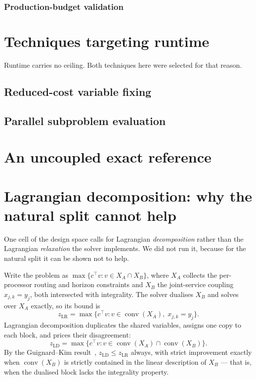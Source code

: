 \documentclass[11pt,a4paper]{article}
\begin{document}


\subsubsection{Production-budget validation}\label{sec:prod}



\section{Techniques targeting runtime}\label{sec:runtime}

Runtime carries no ceiling. Both techniques here were selected for that reason.

\subsection{Reduced-cost variable fixing}\label{sec:fixing}



\subsection{Parallel subproblem evaluation}\label{sec:parallel}



\section{An uncoupled exact reference}\label{sec:exact}



\section{Lagrangian decomposition: why the natural split cannot help}\label{sec:ld}

One cell of the design space calls for Lagrangian \emph{decomposition} rather than
the Lagrangian \emph{relaxation} the solver implements. We did not run it, because
for the natural split it can be shown not to help.

Write the problem as $\max\{c^\top v : v \in X_A \cap X_B\}$, where $X_A$ collects
the per-processor routing and horizon constraints and $X_B$ the joint-service
coupling $x_{j,k}=y_j$, both intersected with integrality. The solver dualises
$X_B$ and solves over $X_A$ exactly, so its bound is
\[
z_{\mathrm{LR}}=\max\{c^\top v : v \in \operatorname{conv}(X_A),\; x_{j,k}=y_j\}.
\]
Lagrangian decomposition duplicates the shared variables, assigns one copy to each
block, and prices their disagreement:
\[
z_{\mathrm{LD}}=\max\{c^\top v : v \in \operatorname{conv}(X_A)\cap
\operatorname{conv}(X_B)\}.
\]
By the Guignard--Kim result~\cite{Guignard2003Lagrangean},
$z_{\mathrm{LD}}\le z_{\mathrm{LR}}$ always, with strict improvement exactly when
$\operatorname{conv}(X_B)$ is strictly contained in the linear description of
$X_B$ --- that is, when the dualised block lacks the integrality property.
\end{document}

